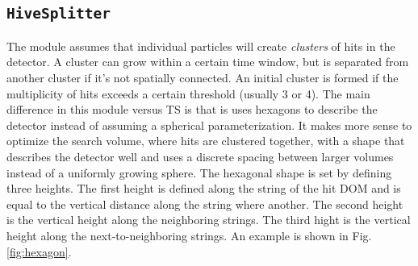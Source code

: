 \subsection{\texttt{HiveSplitter}}
The module assumes that individual particles will create \textit{clusters} of hits in the detector. A cluster can grow within a certain time window, but is separated from another cluster if it's not spatially connected. An initial cluster is formed if the multiplicity of hits exceeds a certain threshold (usually 3 or 4). The main difference in this module versus TS is that is uses hexagons to describe the detector instead of assuming a spherical parameterization. It makes more sense to optimize the search volume, where hits are clustered together, with a shape that describes the detector well and uses a discrete spacing between larger volumes instead of a uniformly growing sphere. The hexagonal shape is set by defining three heights. The first height is defined along the string of the hit DOM and is equal to the vertical distance along the string where another. The second height is the vertical height along the neighboring strings. The third hight is the vertical height along the next-to-neighboring strings. An example is shown in Fig. \ref{fig:hexagon}.


